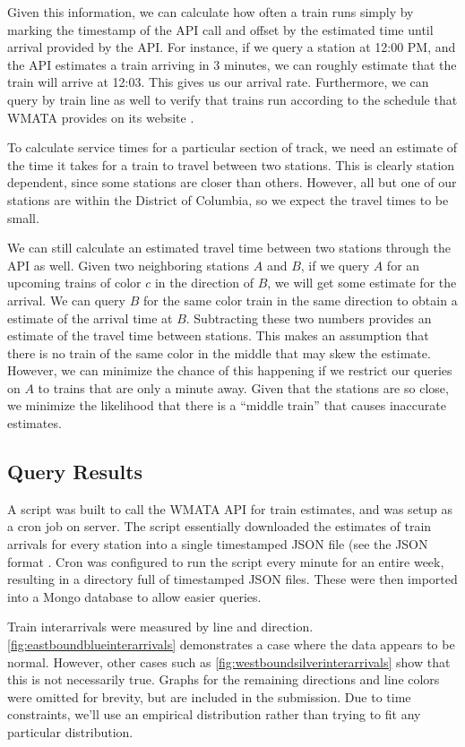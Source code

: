 \documentclass[a4paper,12pt]{article}
\begin{document}
Given this information, we can calculate how often a train runs simply by marking the timestamp of the API call and
offset by the estimated time until arrival provided by the API. For instance, if we query a station at 12:00 PM, and
the API estimates a train arriving in 3 minutes, we can roughly estimate that the train will arrive at 12:03. This
gives us our arrival rate. Furthermore, we can query by train line as well to verify that trains run according to the
schedule that WMATA provides on its website \cite{metroschedule}.

To calculate service times for a particular section of track, we need an estimate of the time it takes for a train to
travel between two stations. This is clearly station dependent, since some stations are closer than others. However,
all but one of our stations are within the District of Columbia, so we expect the travel times to be small.

We can still calculate an estimated travel time between two stations through the API as well. Given two neighboring stations $A$ and $B$, if
we query $A$ for an upcoming trains of color $c$ in the direction of $B$, we will get some estimate for the arrival. We
can query $B$ for the same color train in the same direction to obtain a estimate of the arrival time at $B$.
Subtracting these two numbers provides an estimate of the travel time between stations. This makes an assumption that
there is no train of the same color in the middle that may skew the estimate. However, we can minimize the chance of
this happening if we restrict our queries on $A$ to trains that are only a minute away. Given that the stations are so
close, we minimize the likelihood that there is a ``middle train'' that causes inaccurate estimates.

\subsection{Query Results}
A script was built to call the WMATA API for train estimates, and was setup as a cron job on server. The script
essentially downloaded the estimates of train arrivals for every station into a single timestamped JSON file (see the
JSON format \cite{json}. Cron \cite{crontab} was configured to run the script every minute for an entire week,
resulting in a directory full of timestamped JSON files. These were then imported into a Mongo \cite{mongodb} database 
to allow easier queries.

Train interarrivals were measured by line and direction. \ref{fig:eastboundblueinterarrivals} demonstrates a case where
the data appears to be normal. However, other cases such as \ref{fig:westboundsilverinterarrivals} show that this is
not necessarily true. Graphs for the remaining directions and line colors were omitted for brevity, but are included in
the submission. Due to time constraints, we'll use an empirical distribution rather than trying to fit any particular
distribution.
\end{document}
